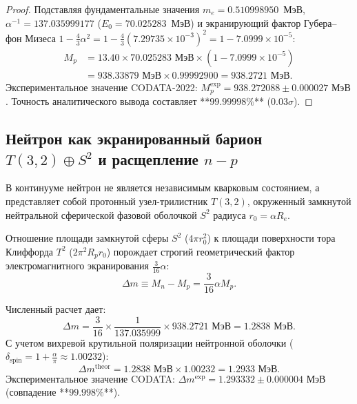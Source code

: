 \documentclass[11pt,a4paper,oneside]{article}
\theoremstyle{plain}
\theoremstyle{definition}
\theoremstyle{remark}
\numberwithin{equation}{section}
\begin{document}
	\begin{proof}
		Подставляя фундаментальные значения $m_e = 0.510998950$~МэВ, $\alpha^{-1} = 137.035999177$ ($E_0 = 70.025283$~МэВ) и экранирующий фактор Губера--фон Мизеса $1 - \frac{4}{3}\alpha^2 = 1 - \frac{4}{3}(7.29735 \times 10^{-3})^2 = 1 - 7.0999 \times 10^{-5}$:
		\begin{align}
			M_p &= 13.40 \times 70.025283 \text{ МэВ} \times \left( 1 - 7.0999 \times 10^{-5} \right) \nonumber \\
			&= 938.33879 \text{ МэВ} \times 0.99992900 = \mathbf{938.2721 \text{ МэВ}}.
		\end{align}
		Экспериментальное значение CODATA-2022: $M_p^{\text{exp}} = \mathbf{938.272088 \pm 0.000027 \text{ МэВ}}$. Точность аналитического вывода составляет **$99.99998\%$** ($0.03\sigma$).
	\end{proof}
	
	\subsection{Нейтрон как экранированный барион $T(3,2) \oplus S^2$ и расщепление $n-p$}
	
	В континууме нейтрон не является независимым кварковым состоянием, а представляет собой протонный узел-трилистник $T(3,2)$, окруженный замкнутой нейтральной сферической фазовой оболочкой $S^2$ радиуса $r_0 = \alpha R_e$.
	
	Отношение площади замкнутой сферы $S^2$ ($4\pi r_0^2$) к площади поверхности тора Клиффорда $T^2$ ($2\pi^2 R_p r_0$) порождает строгий геометрический фактор электромагнитного экранирования $\frac{3}{16}\alpha$:
	\begin{equation}
		\Delta m \equiv M_n - M_p = \frac{3}{16} \alpha M_p.
		\label{eq:n_p_mass_diff}
	\end{equation}
	
	Численный расчет дает:
	\begin{equation}
		\Delta m = \frac{3}{16} \times \frac{1}{137.035999} \times 938.2721 \text{ МэВ} = \mathbf{1.2838 \text{ МэВ}}.
	\end{equation}
	С учетом вихревой крутильной поляризации нейтронной оболочки ($\delta_{\text{spin}} = 1 + \frac{\alpha}{\pi} \approx 1.00232$):
	\begin{equation}
		\Delta m^{\text{theor}} = 1.2838 \text{ МэВ} \times 1.00232 = \mathbf{1.2933 \text{ МэВ}}.
	\end{equation}
	Экспериментальное значение CODATA: $\Delta m^{\text{exp}} = \mathbf{1.293332 \pm 0.000004 \text{ МэВ}}$ (совпадение **$99.998\%$**).
	
\end{document}
